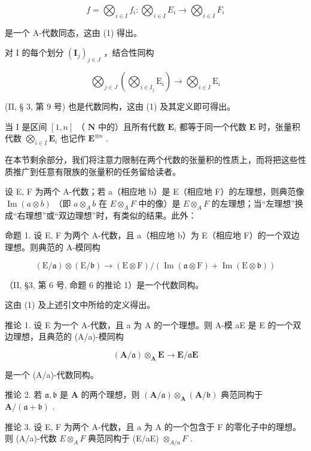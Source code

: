 \[
f = \bigotimes_ {i \in I} f _ {i}: \bigotimes_ {i \in I} E _ {i} \rightarrow \bigotimes_ {i \in I} F _ {i}
\]

是一个 A-代数同态，这由 (1) 得出。

对 I 的每个划分 \((\mathbf{I}_{j})_{j\in J}\) ，结合性同构

\[
\bigotimes_ {j \in J} \left(\bigotimes_ {i \in I _ {j}} \mathrm{E} _ {i}\right)\rightarrow \bigotimes_ {i \in I} \mathrm{E} _ {i}
\]

(II, § 3, 第 9 号) 也是代数同构，这由 (1) 及其定义即可得出。

当 I 是区间 \([1, n]\) （ \(\mathbf{N}\) 中的）且所有代数 \(\mathbf{E}_i\) 都等于同一个代数 \(\mathbf{E}\) 时，张量积代数 \(\bigotimes_{i \in I} \mathbf{E}_i\) 也记作 \(\mathbf{E}^{\otimes n}\) .

在本节剩余部分，我们将注意力限制在两个代数的张量积的性质上，而将把这些性质推广到任意有限族的张量积的任务留给读者。

设 E, F 为两个 A-代数；若 a（相应地 b）是 E（相应地 F）的左理想，则典范像 \(\operatorname{Im}(a \otimes b)\) （即 \(a \otimes_{A} b\) 在 \(E \otimes_{A} F\) 中的像）是 \(E \otimes_{A} F\) 的左理想；当“左理想”换成“右理想”或“双边理想”时，有类似的结果。此外：

命题 1. 设 E, F 为两个 A-代数，且 a（相应地 b）为 E（相应地 F）的一个双边理想。则典范的 A-模同构

\[
(\mathrm{E} / \mathfrak {a}) \otimes (\mathrm{E} / \mathfrak {b}) \rightarrow (\mathrm{E} \otimes \mathrm{F}) / (\operatorname{Im} (\mathfrak {a} \otimes \mathrm{F}) + \operatorname{Im} (\mathrm{E} \otimes \mathfrak {b}))
\]

（II, §3, 第 6 号, 命题 6 的推论 1）是一个代数同构。

这由 (1) 及上述引文中所给的定义得出。

推论 1. 设 E 为一个 A-代数，且 a 为 A 的一个理想。则 A-模 aE 是 E 的一个双边理想，且典范的 (A/a)-模同构

\[
(\mathbf {A} / \mathfrak {a}) \otimes_ {\mathbf {A}} \mathbf {E} \rightarrow \mathbf {E} / \mathfrak {a} \mathbf {E}
\]

是一个 (A/a)-代数同构。

推论 2. 若 \(\mathfrak{a},\mathfrak{b}\) 是 \(\mathbf{A}\) 的两个理想，则 \((\mathbf{A} / \mathfrak{a})\otimes_{\mathbf{A}}(\mathbf{A} / \mathfrak{b})\) 典范同构于 \(\mathbf{A} / (\mathfrak{a} + \mathfrak{b})\) .

推论 3. 设 E, F 为两个 A-代数，且 a 为 A 的一个包含于 F 的零化子中的理想。则 (A/a)-代数 \(E \otimes_{A} F\) 典范同构于 (E/aE) \(\otimes_{A/a} F\) .

